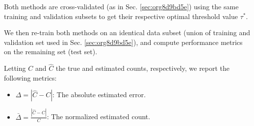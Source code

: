 \documentclass[11pt]{article}
\begin{document}
Both methods are cross-validated (as in Sec. \ref{sec:org8d9bd5e}) using the same training and validation subsets to get their respective
optimal threshold value \(\tau^*\).

We then re-train both methods on an identical data subset (union of training and validation set used in Sec. \ref{sec:org8d9bd5e}), and compute performance metrics on the remaining set (test set).

Letting \(C\) and \(\hat{C}\) the true and estimated counts, respectively, we report the following metrics:

\begin{itemize}
\item \(\Delta = |\hat{C} - C|\): The absolute estimated error.
\item \(\bar{\Delta} = \frac{|\hat{C} - C|}{C}\): The normalized estimated count.
\end{itemize}
\end{document}
